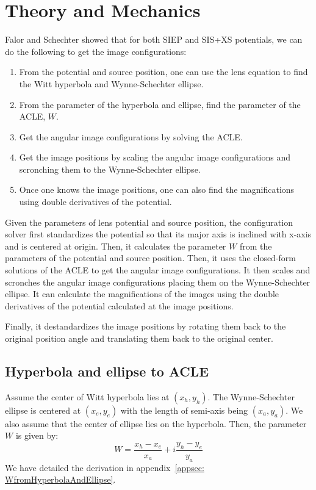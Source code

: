 \documentclass{article}
\begin{document}
\section{Theory and Mechanics}
Falor and Schechter showed that for both SIEP and SIS+XS potentials, we can do the following to get the image configurations:
\begin{enumerate}
    \item From the potential and source position, one can use the lens equation to find the Witt hyperbola and Wynne-Schechter ellipse.
    \item From the parameter of the hyperbola and ellipse, find the parameter of the ACLE, $W$.
    \item Get the angular image configurations by solving the ACLE.
    \item Get the image positions by scaling the angular image configurations and scronching them to the Wynne-Schechter ellipse.
    \item Once one knows the image positions, one can also find the magnifications using double derivatives of the potential.
\end{enumerate}
Given the parameters of lens potential and source position, the configuration solver first standardizes the potential so that its major axis is inclined with x-axis and is centered at origin. Then, it calculates the parameter $W$ from the parameters of the potential and source position. Then, it uses the closed-form solutions of the ACLE to get the angular image configurations. It then scales and scronches the angular image configurations placing them on the Wynne-Schechter ellipse. It can calculate the magnifications of the images using the double derivatives of the potential calculated at the image positions.

Finally, it destandardizes the image positions by rotating them back to the original position angle and translating them back to the original center.

\subsection{Hyperbola and ellipse to ACLE}
Assume the center of Witt hyperbola lies at $(x_h, y_h)$. The Wynne-Schechter ellipse is centered at $(x_e, y_e)$ with the length of semi-axis being $(x_a, y_a)$. We also assume that the center of ellipse lies on the hyperbola. Then, the parameter $W$ is given by:
\begin{equation}
    W = \frac{x_h-x_e}{x_a} + i\frac{y_h-y_e}{y_a}
\end{equation}
We have detailed the derivation in appendix~\ref{appsec: WfromHyperbolaAndEllipse}.
\end{document}

